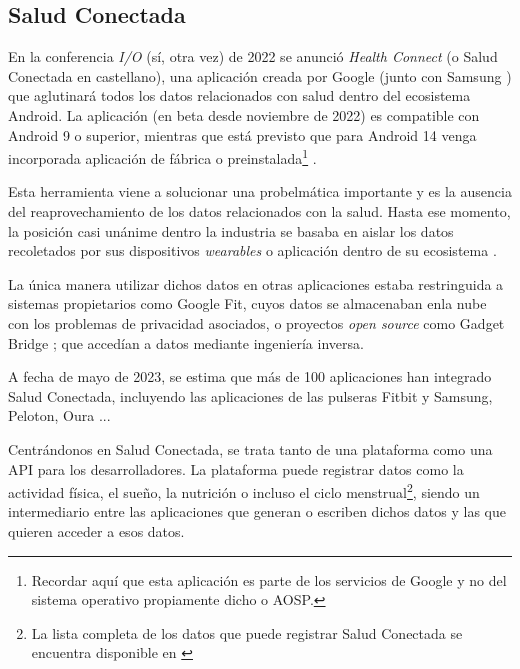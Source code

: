        \subsection{Salud Conectada}
            \label{section:salud_conectada}
            En la conferencia \textit{I/O} (sí, otra vez) de 2022 se anunció \textit{Health Connect} (o Salud Conectada
            en castellano), una aplicación creada por Google (junto con Samsung \cite{wilk_introducing_2022}) 
            que aglutinará todos los datos relacionados con salud dentro del ecosistema
            Android. La aplicación (en beta desde noviembre de 2022) es compatible con Android 9 o 
            superior, mientras que está previsto que para Android 14 venga
            incorporada aplicación de fábrica o preinstalada\footnote{Recordar aquí que esta aplicación es
            parte de los servicios de Google y no del sistema operativo propiamente dicho o AOSP.} 
            \cite{pandey_health_2023}. 

            Esta herramienta viene a solucionar una probelmática importante y es la ausencia del reaprovechamiento de 
            los datos relacionados con la salud. Hasta ese momento, la posición casi unánime dentro la 
            industria se basaba en aislar los datos recoletados por sus dispositivos \textit{\glspl{wearable}} o aplicación 
            dentro de su ecosistema \cite{ramirez_android_2022} \cite{rahman_android_2023}. 
            
            La única manera utilizar dichos datos 
            en otras aplicaciones estaba restringuida a sistemas propietarios como Google Fit, cuyos datos se 
            almacenaban enla nube con los problemas de privacidad asociados, o proyectos \textit{open source} como 
            Gadget Bridge \cite{freeyourgadget_gadgetbridge_nodate}; que accedían a datos mediante ingeniería inversa.
            

            A fecha de mayo de 2023, se estima que más de 100 aplicaciones han integrado Salud Conectada, incluyendo
            las aplicaciones de las pulseras Fitbit y Samsung, Peloton, Oura \cite{malik_googles_2023}... 

            Centrándonos en Salud Conectada, se trata tanto de una plataforma como una API para los desarrolladores.
            La plataforma puede registrar datos como la actividad física, el sueño, la nutrición o incluso el ciclo
            menstrual\footnote{La lista completa de los datos que puede registrar Salud Conectada se encuentra 
            disponible en \cite{noauthor_lista_nodate}}, siendo un intermediario entre las aplicaciones que generan 
            o escriben dichos datos y las que quieren acceder a esos datos. 

